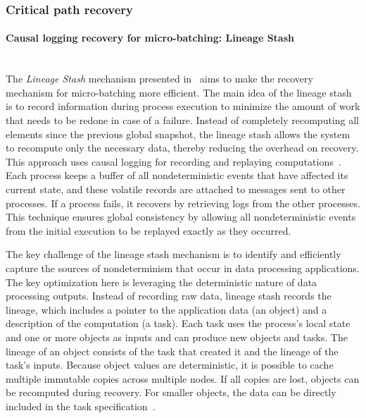 \subsubsection{Critical path recovery}
\label{phd-related-critical-path-recovery}

\paragraph{Causal logging recovery for micro-batching: Lineage Stash} \mbox{} \\

The {\em Lineage Stash} mechanism presented in~\cite{Wang:2019:LSF:3341301.3359653} aims to make the recovery mechanism for micro-batching more efficient. The main idea of the lineage stash is to record information during process execution to minimize the amount of work that needs to be redone in case of a failure. Instead of completely recomputing all elements since the previous global snapshot, the lineage stash allows the system to recompute only the necessary data, thereby reducing the overhead on recovery. This approach uses causal logging for recording and replaying computations~\cite{elnozahy1994manetho, alvisi1998message}. Each process keeps a buffer of all nondeterministic events that have affected its current state, and these volatile records are attached to messages sent to other processes. If a process fails, it recovers by retrieving logs from the other processes. This technique ensures global consistency by allowing all nondeterministic events from the initial execution to be replayed exactly as they occurred.

The key challenge of the lineage stash mechanism is to identify and efficiently capture the sources of nondeterminism that occur in data processing applications. The key optimization here is leveraging the deterministic nature of data processing outputs. Instead of recording raw data, lineage stash records the lineage, which includes a pointer to the application data (an object) and a description of the computation (a task). Each task uses the process's local state and one or more objects as inputs and can produce new objects and tasks. The lineage of an object consists of the task that created it and the lineage of the task's inputs. Because object values are deterministic, it is possible to cache multiple immutable copies across multiple nodes. If all copies are lost, objects can be recomputed during recovery. For smaller objects, the data can be directly included in the task specification~\cite{Wang:2019:LSF:3341301.3359653}.

